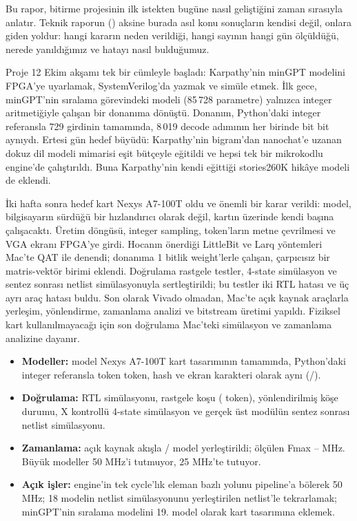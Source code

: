 Bu rapor, bitirme projesinin ilk istekten bugüne nasıl geliştiğini zaman sırasıyla anlatır. Teknik raporun () aksine burada asıl konu sonuçların kendisi değil, onlara giden yoldur: hangi kararın neden verildiği, hangi sayının hangi gün ölçüldüğü, nerede yanıldığımız ve hatayı nasıl bulduğumuz.

Proje 12 Ekim akşamı tek bir cümleyle başladı: Karpathy'nin minGPT modelini FPGA'ye uyarlamak, SystemVerilog'da yazmak ve simüle etmek. İlk gece, minGPT'nin sıralama görevindeki  modeli (85\,728 parametre) yalnızca integer aritmetiğiyle çalışan bir donanıma dönüştü. Donanım, Python'daki integer referansla 729 girdinin tamamında, 8\,019 decode adımının her birinde bit bit aynıydı. Ertesi gün hedef büyüdü: Karpathy'nin bigram'dan nanochat'e uzanan dokuz dil modeli mimarisi eşit bütçeyle eğitildi ve hepsi tek bir mikrokodlu engine'de çalıştırıldı. Buna Karpathy'nin kendi eğittiği stories260K hikâye modeli de eklendi.

İki hafta sonra hedef kart Nexys A7-100T oldu ve önemli bir karar verildi: model, bilgisayarın sürdüğü bir hızlandırıcı olarak değil, kartın üzerinde kendi başına çalışacaktı. Üretim döngüsü, integer sampling, token'ların metne çevrilmesi ve VGA ekranı FPGA'ye girdi. Hocanın önerdiği LittleBit ve Larq yöntemleri Mac'te QAT ile denendi; donanıma 1 bitlik weight'lerle çalışan, çarpıcısız bir matris-vektör birimi eklendi. Doğrulama rastgele testler, 4-state simülasyon ve sentez sonrası netlist simülasyonuyla sertleştirildi; bu testler iki RTL hatası ve üç ayrı araç hatası buldu. Son olarak Vivado olmadan, Mac'te açık kaynak araçlarla yerleşim, yönlendirme, zamanlama analizi ve bitstream üretimi yapıldı. Fiziksel kart kullanılmayacağı için son doğrulama Mac'teki simülasyon ve zamanlama analizine dayanır.

\medskip
\begin{ozet}
\begin{itemize}[leftmargin=12pt]
  \item \textbf{Modeller:} \gBoardModels{} model Nexys A7-100T kart tasarımının tamamında, Python'daki integer referansla token token, hash ve ekran karakteri olarak aynı (\gBoardPass{}/\gBoardModels{}).
  \item \textbf{Doğrulama:} RTL simülasyonu, \gFuzzRuns{} rastgele koşu (\gFuzzTokens{} token), \gDirectedCases{} yönlendirilmiş köşe durumu, X kontrollü 4-state simülasyon ve gerçek üst modülün sentez sonrası netlist simülasyonu.
  \item \textbf{Zamanlama:} açık kaynak akışla \gPnrDone{}/\gPnrTotal{} model yerleştirildi; ölçülen Fmax \gPnrFmaxMin{}–\gPnrFmaxMax{} MHz. Büyük modeller 50 MHz'i tutmuyor, 25 MHz'te tutuyor.
  \item \textbf{Açık işler:} engine'in tek cycle'lık eleman bazlı yolunu pipeline'a bölerek 50 MHz; 18 modelin netlist simülasyonunu yerleştirilen netlist'le tekrarlamak; minGPT'nin sıralama modelini 19. model olarak kart tasarımına eklemek.
\end{itemize}
\end{ozet}

